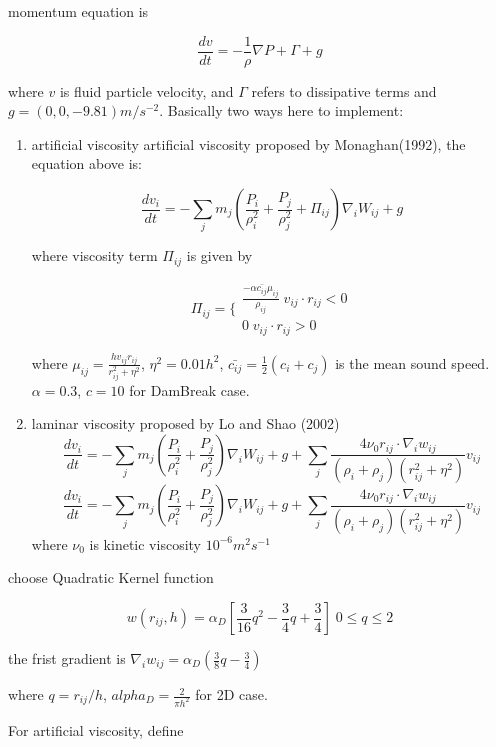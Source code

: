 \documentclass[11pt]{article}
\begin{document}
momentum equation is 

$$ \frac{dv}{dt} = - \frac{1}{\rho} \nabla P + \Gamma + g $$

where $v$ is fluid particle velocity, and $\Gamma$ refers to dissipative terms and $ g=(0,0,-9.81) m/s^{-2} $. Basically two ways here to implement:

\begin{enumerate}
\item{artificial viscosity}
artificial viscosity proposed by Monaghan(1992), the equation above is:

$$  \frac{dv_i}{dt} = - \sum_{j} m_j (\frac{P_i}{\rho _i ^2} + \frac{P_j}{\rho_j ^2} + \Pi _{ij} ) \nabla_i W_{ij} + g $$

where viscosity term $\Pi_{ij}$ is given by

$$ \Pi_{ij} = \{ \begin{array}{c} \frac{-\alpha \bar{c_{ij}} \mu_{ij}}{\rho _{ij}} \; v_{ij} \cdot r_{ij} < 0 \\ 0 \;  v_{ij} \cdot r_{ij} > 0 \end{array} $$

where $ \mu_{ij} = \frac{h v_{ij} r_{ij}}{ r_{ij}^2 + \eta ^2} $, $\eta^2 = 0.01 h^2$, $\bar{c_{ij}} = \frac{1}{2}(c_i+c_j)$ is the mean sound speed. $\alpha = 0.3$, $c=10$  for DamBreak case. 

\item{laminar viscosity}
proposed by Lo and Shao (2002)$$  \frac{dv_i}{dt} = - \sum_{j} m_j (\frac{P_i}{\rho _i ^2} + \frac{P_j}{\rho_j ^2}) \nabla_i W_{ij} + g + \sum_{j} \frac{4 \nu_0 r_{ij} \cdot \nabla_i w_{ij}}{(\rho_i + \rho_j)(r_{ij}^2+\eta^2)}v_{ij} $$
$$  \frac{dv_i}{dt} = - \sum_{j} m_j (\frac{P_i}{\rho _i ^2} + \frac{P_j}{\rho_j ^2}) \nabla_i W_{ij} + g + \sum_{j} \frac{4 \nu_0 r_{ij} \cdot \nabla_i w_{ij}}{(\rho_i + \rho_j)(r_{ij}^2+\eta^2)}v_{ij} $$
where $\nu_0$ is kinetic viscosity $ 10^{-6} m^2s^{-1} $

\end{enumerate}

choose Quadratic Kernel function

$$w(r_{ij},h)  = \alpha_D [ \frac{3}{16} q^2 - \frac{3}{4} q + \frac{3}{4}] \; 0 \leq q \leq 2 $$

the frist gradient is $ \nabla_i w_{ij} = \alpha_D (\frac{3}{8} q - \frac{3}{4})$

where $ q= r_{ij}/h $, $alpha_D = \frac{2}{\pi h^2}$ for 2D case.

For artificial viscosity, define
\end{document}

